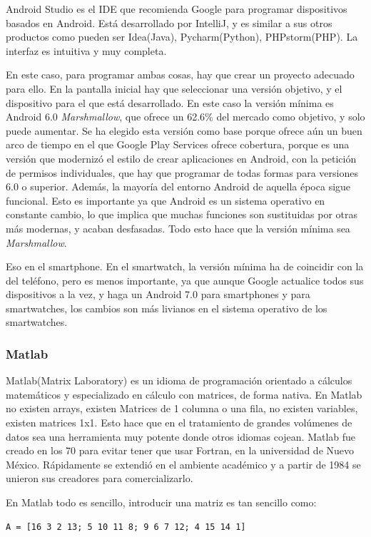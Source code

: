 \documentclass[12pt]{article}
\numberwithin{equation}{section}
\begin{document}
Android Studio es el IDE que recomienda Google para programar dispositivos basados en Android. Está desarrollado por IntelliJ, y es similar a sus otros productos como pueden ser Idea(Java), Pycharm(Python), PHPstorm(PHP). La interfaz es intuitiva y muy completa.

En este caso, para programar ambas cosas, hay que crear un proyecto adecuado para ello. En la pantalla inicial hay que seleccionar una versión objetivo, y el dispositivo para el que está desarrollado. En este caso la versión mínima es Android 6.0 \textit{Marshmallow}, que ofrece un 62.6\% del mercado como objetivo, y solo puede aumentar. Se ha elegido esta versión como base porque ofrece aún un buen arco de tiempo en el que Google Play Services ofrece cobertura, porque es una versión que modernizó el estilo de crear aplicaciones en Android, con la petición de permisos individuales, que hay que programar de todas formas para versiones 6.0 o superior. Además, la mayoría del entorno Android de aquella época sigue funcional. Esto es importante ya que Android es un sistema operativo en constante cambio, lo que implica que muchas funciones son sustituidas por otras más modernas, y acaban desfasadas. Todo esto hace que la versión mínima sea \textit{Marshmallow}.

Eso en el smartphone. En el smartwatch, la versión mínima ha de coincidir con la del teléfono, pero es menos importante, ya que aunque Google actualice todos sus dispositivos a la vez, y haga un Android 7.0 para smartphones y para smartwatches, los cambios son más livianos en el sistema operativo de los smartwatches.


\subsubsection{Matlab}

Matlab(Matrix Laboratory) es un idioma de programación orientado a cálculos matemáticos y especializado en cálculo con matrices, de forma nativa. En Matlab no existen arrays, existen Matrices de 1 columna o una fila, no existen variables, existen matrices 1x1. Esto hace que en el tratamiento de grandes volúmenes de datos sea una herramienta muy potente donde otros idiomas cojean. Matlab fue creado en los 70 para evitar tener que usar Fortran, en la universidad de Nuevo México. Rápidamente se extendió en el ambiente académico y a partir de 1984 se unieron sus creadores para comercializarlo. 

En Matlab todo es sencillo, introducir una matriz es tan sencillo como:
\lstset{language=matlab}
\begin{lstlisting}
A = [16 3 2 13; 5 10 11 8; 9 6 7 12; 4 15 14 1]
\end{lstlisting}
\end{document}
